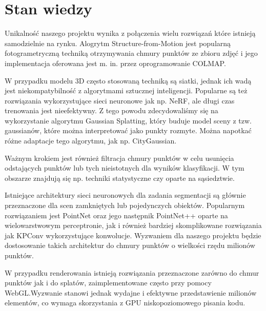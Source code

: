 \section{Stan wiedzy}

Unikalność naszego projektu wynika z połączenia wielu rozwiązań które istnieją samodzielnie na rynku. Alogrytm Structure-from-Motion jest popularną fotogrametryczną techniką otrzymywania chmury punktów ze zbioru zdjęć i jego implementacja oferowana jest m. in. przez oprogramowanie COLMAP. 

W przypadku modelu 3D często stosowaną techniką są siatki, jednak ich wadą jest niekompatybilność z algorytmami sztucznej inteligencji. Popularne są też rozwiązania wykorzystujące sieci neuronowe jak np. NeRF\cite{mildenhall2020nerfrepresentingscenesneural}, ale długi czas trenowania jest nieefektywny. Z tego powodu zdecydowaliśmy się na wykorzystanie algorytmu Gaussian Splatting\cite{kerbl3Dgaussians}, który buduje model sceny z tzw. gaussianów, które można interpretować jako punkty rozmyte. Można napotkać różne adaptacje tego algorytmu, jak np. CityGaussian\cite{liu2024citygaussian}.

Ważnym krokiem jest również filtracja chmury punktów w celu usunięcia odstających punktów lub tych nieistotnych dla wyników klasyfikacji. W tym obszarze znajdują się np. techniki statystyczne czy oparte na sąsiedztwie. 

Istniejące architektury sieci neuronowych dla zadania segmentacji są głównie przeznaczone dla scen zamkniętych lub pojedynczych obiektów. Popularnym rozwiązaniem jest PointNet\cite{qi2016pointnet} oraz jego następnik PointNet++\cite{qi2017pointnetdeephierarchicalfeature} oparte na wielowarstwowym perceptronie, jak i również bardziej skomplikowane rozwiązania jak KPConv\cite{thomas2019kpconvflexibledeformableconvolution} wykorzystujące konwolucje. Wyzwaniem dla naszego projektu będzie dostosowanie takich architektur do chmury punktów o wielkości rzędu milionów punktów.  

W przypadku renderowania istnieją rozwiązania przeznaczone zarówno do chmur punktów jak i do splatów, zaimplementowane często przy pomocy WebGL.Wyzwanie stanowi jednak wydajne i efektywne przedstawienie milionów elementów, co wymaga skorzystania z GPU niskopoziomowego pisania kodu. 

